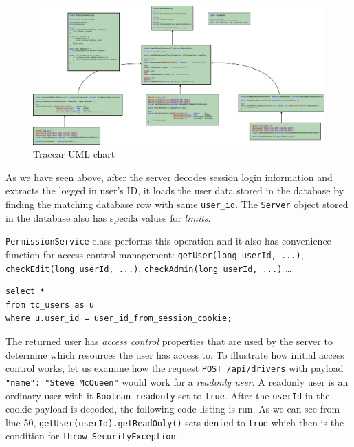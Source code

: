 \documentclass[a4paper]{article}
\begin{document}
\begin{figure}
    \centering
    \includegraphics[width=\textheight]{graphics/uml-chart.png}
    \caption{Traccar UML chart}
\end{figure}

\lstset{style=custom-java}
As we have seen above, after the server decodes session login information and extracts the logged in user's ID, it loads the user 
data stored in the database by finding the matching database row with same \lstinline{user_id}. The \lstinline{Server} object stored
in the database also has specila values for \emph{limits}.

\lstinline{PermissionService} class performs this operation and it also has convenience function for access control management: 
\lstinline{getUser(long userId, ...)}, \lstinline{checkEdit(long userId, ...)}, \lstinline{checkAdmin(long userId, ...)} \ldots

\begin{verbatim}
select * 
from tc_users as u 
where u.user_id = user_id_from_session_cookie; 
\end{verbatim}

\lstset{style=custom-java}
The returned user has \emph{access control} properties that are used by the server to determine which resources the user has access
to. To illustrate how initial access control works, let us examine how the request \lstinline{POST /api/drivers} with payload 
\lstinline{"name": "Steve McQueen"} would work for a \emph{readonly user}. A readonly user is an ordinary user with it 
\lstinline{Boolean readonly} set to \lstinline{true}. After the \lstinline{userId} in the cookie payload is decoded, the following
code listing is run. As we can see from line 50, \lstinline{getUser(userId).getReadOnly()} sets \lstinline{denied} to
\lstinline{true} which then is the condition for \lstinline{throw SecurityException}.
\end{document}
